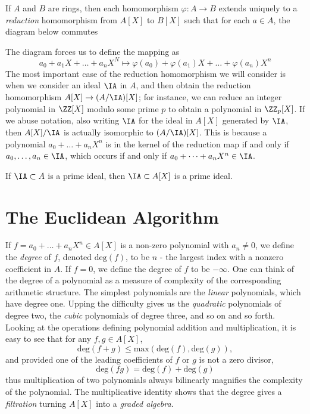 If $A$ and $B$ are rings, then each homomorphism $\varphi: A \to B$ extends uniquely to a \emph{reduction} homomorphism from $A[X]$ to $B[X]$ such that for each $a \in A$, the diagram below commutes
%
\begin{center}
\end{center}
%
The diagram forces us to define the mapping as
%
\[ a_0 + a_1 X + \dots + a_n X^N \mapsto \varphi(a_0) + \varphi(a_1) X + \dots + \varphi(a_n) X^n \]
%
The most important case of the reduction homomorphism we will consider is when we consider an ideal $\IA$ in $A$, and then obtain the reduction homomorphism $A[X] \to (A/\IA)[X]$; for instance, we can reduce an integer polynomial in $\ZZ[X]$ modulo some prime $p$ to obtain a polynomial in $\ZZ_p[X]$. If we abuse notation, also writing $\IA$ for the ideal in $A[X]$ generated by $\IA$, then $A[X]/\IA$ is actually isomorphic to $(A/\IA)[X]$. This is because a polynomial $a_0 + \dots + a_n X^n$ is in the kernel of the reduction map if and only if $a_0, \dots, a_n \in \IA$, which occurs if and only if $a_0 + \dots + a_n X^n \in \IA$.

\begin{corollary}
    If $\IA \subset A$ is a prime ideal, then $\IA \subset A[X]$ is a prime ideal.
\end{corollary}

\section{The Euclidean Algorithm}

If $f = a_0 + \dots + a_nX^n \in A[X]$ is a non-zero polynomial with $a_n \neq 0$, we define the {\it degree} of $f$, denoted $\text{deg}(f)$, to be $n$ - the largest index with a nonzero coefficient in $A$. If $f = 0$, we define the degree of $f$ to be $-\infty$. One can think of the degree of a polynomial as a measure of complexity of the corresponding arithmetic structure. The simplest polynomials are the {\it linear} polynomials, which have degree one. Upping the difficulty gives us the {\it quadratic} polynomials of degree two, the {\it cubic} polynomials of degree three, and so on and so forth. Looking at the operations defining polynomial addition and multiplication, it is easy to see that for any $f,g \in A[X]$,
%
\[ \text{deg}(f + g) \leq \text{max}(\text{deg}(f), \text{deg}(g)), \]
%
and provided one of the leading coefficients of $f$ or $g$ is not a zero divisor,
%
\[ \text{deg}(fg) = \text{deg}(f) + \text{deg}(g) \]
%
thus multiplication of two polynomials always bilinearly magnifies the complexity of the polynomial. The multiplicative identity shows that the degree gives a {\it filtration} turning $A[X]$ into a {\it graded algebra}.

